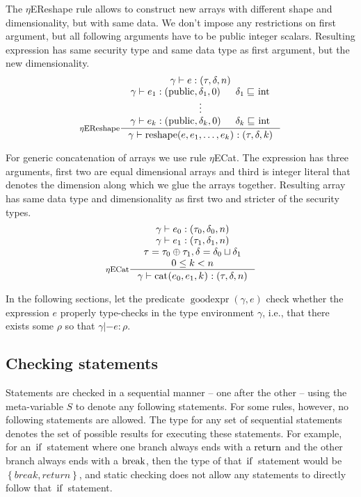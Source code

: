 \documentclass[a4paper, 10pt, draft]{report}
\newcommand{\mycode}[1]{\ensuremath{\mbox{\lstinline{#1}}}}
\begin{document}
The $\eta$EReshape rule allows to construct new arrays with different shape and
dimensionality, but with same data. We don't impose any restrictions on first
argument, but all following arguments have to be public integer scalars.
Resulting expression has same security type and same data type as first
argument, but the new dimensionality.
\[ \inference[$\eta$EReshape]
{
  \gamma |- e : \left(\tau, \delta, n\right) \\
  \gamma |- e_1 : \left(\mycode{public}, \delta_1, 0\right) & \delta_1 \sqsubseteq \mycode{int} \\
  \vdots \\
  \gamma |- e_k : \left(\mycode{public}, \delta_k, 0\right) & \delta_k \sqsubseteq \mycode{int}     }
{
  \gamma |- \mycode{reshape(} e , e_1, \ldots, e_k \mycode{)} : \left(\tau, \delta, k\right)
} \]

For generic concatenation of arrays we use rule $\eta$ECat. The expression has
three arguments, first two are equal dimensional arrays and third is integer
literal that denotes the dimension along which we glue the arrays together.
Resulting array has same data type and dimensionality as first two and stricter
of the security types.
\[ \inference[$\eta$ECat]
{
  \gamma |- e_0 : \left(\tau_0, \delta_0, n \right) \\
  \gamma |- e_1 : \left(\tau_1, \delta_1, n \right) \\
  \tau = \tau_0 \oplus \tau_1, \delta = \delta_0 \sqcup \delta_1 \\
  0 \leq k < n
} 
{
  \gamma |- \mycode{cat(} e_0 , e_1, k \mycode{)} : \left(\tau, \delta, n\right)
} \]


In the following sections, let the predicate
$\operatorname{goodexpr}\!\left(\gamma, e\right)$ check whether the expression
$e$ properly type-checks in the type environment $\gamma$, i.e., that there
exists some $\rho$ so that $\gamma |- e : \rho$.

\subsection{Checking statements}\label{sec:checking:typing:statements}

Statements are checked in a sequential manner -- one after the other -- using
the meta-variable $S$ to denote any following statements. For some rules,
however, no following statements are allowed. The type for any set of
sequential statements denotes the set of possible results for executing these
statements. For example, for an \mycode{if} statement where one branch always
ends with a \mycode{return} and the other branch always ends with a
\mycode{break}, then the type of that \mycode{if} statement would be
$\left\{break, return\right\}$, and static checking does not allow any
statements to directly follow that \mycode{if} statement.
\end{document}
